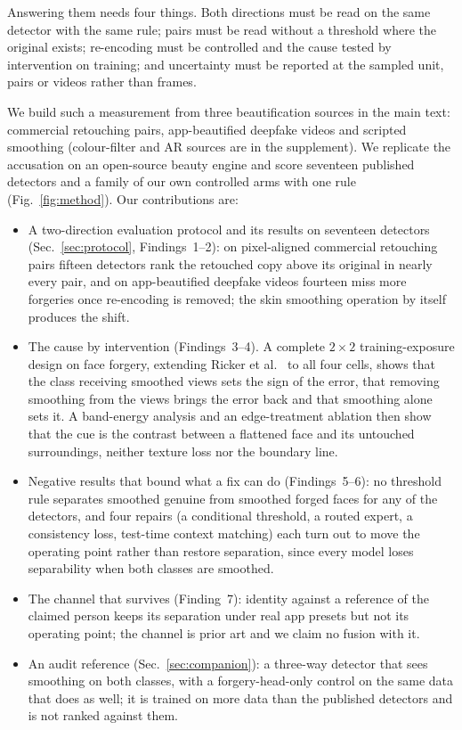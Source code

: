 \documentclass[journal]{IEEEtran}  %
\begin{document}
Answering them needs four things. Both directions must be read on the same detector with the same rule; pairs must be read without a threshold where the original exists; re-encoding must be controlled and the cause tested by intervention on training; and uncertainty must be reported at the sampled unit, pairs or videos rather than frames.

We build such a measurement from three beautification sources in the main text: commercial retouching pairs, app-beautified
deepfake videos and scripted smoothing (colour-filter and AR sources are in the supplement). We replicate the accusation on an
open-source beauty engine and score seventeen published detectors and a family of our own controlled arms with one rule (Fig.~\ref{fig:method}). Our contributions are:
\begin{itemize}
\item A two-direction evaluation protocol and its results on seventeen detectors (Sec.~\ref{sec:protocol},
Findings~1--2): on pixel-aligned commercial retouching pairs fifteen detectors rank the retouched copy above its original
in nearly every pair, and on app-beautified deepfake videos fourteen miss more forgeries once re-encoding is removed; the
skin smoothing operation by itself produces the shift.
\item The cause by intervention (Findings~3--4). A complete $2\times2$ training-exposure design on face forgery, extending Ricker et al.~\cite{ricker2026biasid} to all four cells, shows that the class receiving smoothed views sets the
sign of the error, that removing smoothing from the views brings the error back and that smoothing alone sets it. A
band-energy analysis and an edge-treatment ablation then show that the cue is the contrast between a flattened face and its
untouched surroundings, neither texture loss nor the boundary line.
\item Negative results that bound what a fix can do (Findings~5--6): no threshold rule separates smoothed genuine from
smoothed forged faces for any of the detectors, and four repairs (a conditional threshold, a routed expert, a consistency
loss, test-time context matching) each turn out to move the operating point rather than restore separation, since every
model loses separability when both classes are smoothed.
\item The channel that survives (Finding~7): identity against a reference of the claimed person keeps its separation under
real app presets but not its operating point; the channel is prior art and we claim no fusion with it.
\item An audit reference (Sec.~\ref{sec:companion}): a three-way detector that sees smoothing on both classes, with a
forgery-head-only control on the same data that does as well; it is trained on more data than the published detectors and
is not ranked against them.
\end{itemize}
\end{document}
